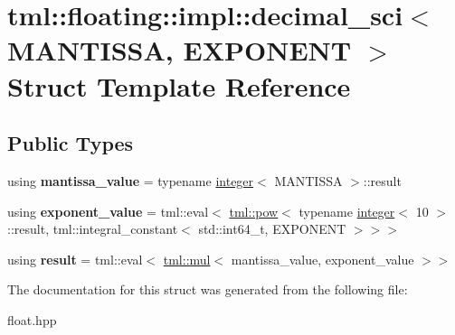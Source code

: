 \hypertarget{structtml_1_1floating_1_1impl_1_1decimal__sci}{\section{tml\+:\+:floating\+:\+:impl\+:\+:decimal\+\_\+sci$<$ M\+A\+N\+T\+I\+S\+S\+A, E\+X\+P\+O\+N\+E\+N\+T $>$ Struct Template Reference}
\label{structtml_1_1floating_1_1impl_1_1decimal__sci}
}
\subsection*{Public Types}
\begin{DoxyCompactItemize}
\item 
\hypertarget{structtml_1_1floating_1_1impl_1_1decimal__sci_a52bd10faffe434dc1b985ed4ad600e32}{using {\bfseries mantissa\+\_\+value} = typename \hyperlink{structtml_1_1floating_1_1impl_1_1integer}{integer}$<$ M\+A\+N\+T\+I\+S\+S\+A $>$\+::result}\label{structtml_1_1floating_1_1impl_1_1decimal__sci_a52bd10faffe434dc1b985ed4ad600e32}

\item 
\hypertarget{structtml_1_1floating_1_1impl_1_1decimal__sci_ae5957f6708d05fc8420d49347b1bbd8b}{using {\bfseries exponent\+\_\+value} = tml\+::eval$<$ \hyperlink{structtml_1_1pow}{tml\+::pow}$<$ typename \hyperlink{structtml_1_1floating_1_1impl_1_1integer}{integer}$<$ 10 $>$\+::result, tml\+::integral\+\_\+constant$<$ std\+::int64\+\_\+t, E\+X\+P\+O\+N\+E\+N\+T $>$$>$$>$}\label{structtml_1_1floating_1_1impl_1_1decimal__sci_ae5957f6708d05fc8420d49347b1bbd8b}

\item 
\hypertarget{structtml_1_1floating_1_1impl_1_1decimal__sci_aa6026c66a2fc82c8a462d6112c2ee5f8}{using {\bfseries result} = tml\+::eval$<$ \hyperlink{structtml_1_1mul}{tml\+::mul}$<$ mantissa\+\_\+value, exponent\+\_\+value $>$$>$}\label{structtml_1_1floating_1_1impl_1_1decimal__sci_aa6026c66a2fc82c8a462d6112c2ee5f8}

\end{DoxyCompactItemize}


The documentation for this struct was generated from the following file\+:\begin{DoxyCompactItemize}
\item 
float.\+hpp\end{DoxyCompactItemize}
